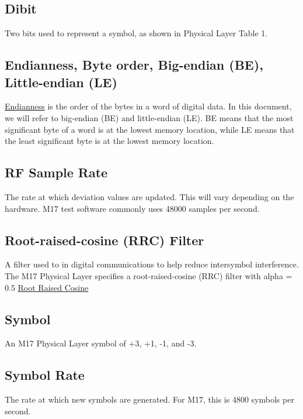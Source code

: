 \documentclass[a4paper,11pt,oneside]{book}
\begin{document}
\subsection{Dibit}

Two bits used to represent a symbol, as shown in Physical Layer Table 1.

\subsection{Endianness, Byte order, Big-endian (BE), Little-endian (LE)}

\href{https://en.wikipedia.org/wiki/Endianness}{Endianness} is the order of the bytes in a word of digital data. In this document, we will refer to big-endian (BE) and little-endian (LE). BE means that the most significant byte of a word is at the lowest memory location, while LE means that the least significant byte is at the lowest memory location.

\subsection{RF Sample Rate}

The rate at which deviation values are updated. This will vary depending on the hardware. M17 test software commonly uses 48000 samples per second.

\subsection{Root-raised-cosine (RRC) Filter}

A filter used to in digital communications to help reduce intersymbol interference. The M17 Physical Layer specifies a root-raised-cosine (RRC) filter with alpha = 0.5 \href{https://en.wikipedia.org/wiki/Root-raised-cosine_filter}{Root
Raised Cosine}

\subsection{Symbol}

An M17 Physical Layer symbol of +3, +1, -1, and -3.

\subsection{Symbol Rate}

The rate at which new symbols are generated. For M17, this is 4800 symbols per second.
\end{document}
